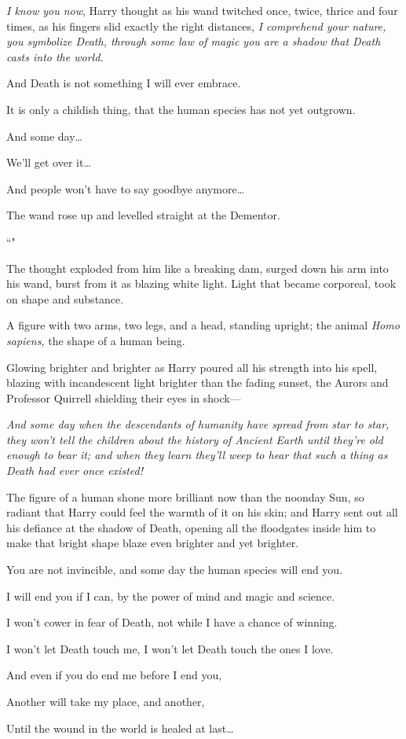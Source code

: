 \emph{I know you now}, Harry thought as his wand twitched once, twice, thrice and four times, as his fingers slid exactly the right distances, \emph{I comprehend your nature, you symbolize Death, through some law of magic you are a shadow that Death casts into the world.}

\begin{em}
And Death is not something I will ever embrace.

It is only a childish thing, that the human species has not yet outgrown.

And some day{\ldots}

We'll get over it{\ldots}

And people won't have to say goodbye anymore{\ldots}
\end{em}

The wand rose up and levelled straight at the Dementor.

``\emph{}"

The thought exploded from him like a breaking dam, surged down his arm into his wand, burst from it as blazing white light. Light that became corporeal, took on shape and substance.

A figure with two arms, two legs, and a head, standing upright; the animal \emph{Homo sapiens,} the shape of a human being.

Glowing brighter and brighter as Harry poured all his strength into his spell, blazing with incandescent light brighter than the fading sunset, the Aurors and Professor Quirrell shielding their eyes in shock—

\emph{And some day when the descendants of humanity have spread from star to star, they won't tell the children about the history of Ancient Earth until they're old enough to bear it; and when they learn they'll weep to hear that such a thing as Death had ever once existed!}

The figure of a human shone more brilliant now than the noonday Sun, so radiant that Harry could feel the warmth of it on his skin; and Harry sent out all his defiance at the shadow of Death, opening all the floodgates inside him to make that bright shape blaze even brighter and yet brighter.

\begin{em}
You are not invincible, and some day the human species will end you.

I will end you if I can, by the power of mind and magic and science.

I won't cower in fear of Death, not while I have a chance of winning.

I won't let Death touch me, I won't let Death touch the ones I love.

And even if you do end me before I end you,

Another will take my place, and another,

Until the wound in the world is healed at last{\ldots}
\end{em}

